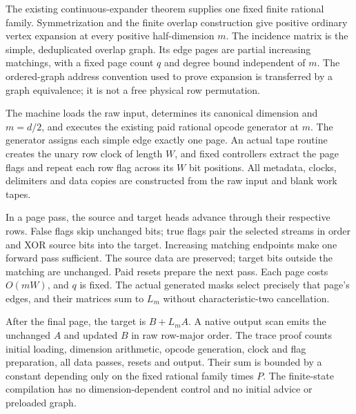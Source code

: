 \begin{proofoutline}
The existing continuous-expander theorem supplies one fixed finite rational
family. Symmetrization and the finite overlap construction give positive
ordinary vertex expansion at every positive half-dimension $m$. The
incidence matrix is the simple, deduplicated overlap graph. Its edge pages
are partial increasing matchings, with a fixed page count $q$ and degree
bound independent of $m$. The ordered-graph address convention used to
prove expansion is transferred by a graph equivalence; it is not a free
physical row permutation.

The machine loads the raw input, determines its canonical dimension and
$m=d/2$, and executes the existing paid rational opcode generator at $m$.
The generator assigns each simple edge exactly one page. An actual tape
routine creates the unary row clock of length $W$, and fixed controllers
extract the page flags and repeat each row flag across its $W$ bit positions.
All metadata, clocks, delimiters and data copies are constructed from the
raw input and blank work tapes.

In a page pass, the source and target heads advance through their respective
rows. False flags skip unchanged bits; true flags pair the selected streams
in order and XOR source bits into the target. Increasing matching endpoints
make one forward pass sufficient. The source data are preserved; target
bits outside the matching are unchanged. Paid resets prepare the next pass.
Each page costs $O(mW)$, and $q$ is fixed. The actual generated masks select
precisely that page's edges, and their matrices sum to $L_m$ without
characteristic-two cancellation.

After the final page, the target is $B+L_mA$. A native output scan emits the
unchanged $A$ and updated $B$ in raw row-major order. The trace proof counts
initial loading, dimension arithmetic, opcode generation, clock and flag
preparation, all data passes, resets and output. Their sum is bounded by a
constant depending only on the fixed rational family times $P$. The
finite-state compilation has no dimension-dependent control and no initial
advice or preloaded graph.
\end{proofoutline}
